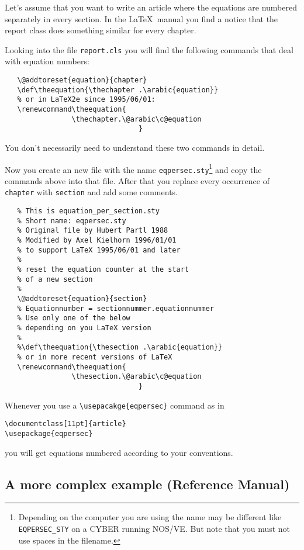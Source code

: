 \documentclass[twoside,a4paper]{refart}
\begin{document}
Let's assume that you want to write an article where the equations are 
numbered separately in every section. In the \LaTeX\ manual you find a 
notice that the report class does something similar for every chapter.

Looking into the file \texttt{report.cls} you will find the following 
commands that deal with equation numbers:\nopagebreak
\begin{verbatim}
   \@addtoreset{equation}{chapter}
   \def\theequation{\thechapter .\arabic{equation}}
   % or in LaTeX2e since 1995/06/01:
   \renewcommand\theequation{
                \thechapter.\@arabic\c@equation
                                }
\end{verbatim}

You don't necessarily need to understand these two commands in detail.

Now you create an new file with the name 
\texttt{eqpersec.sty}\footnote{Depending on the computer you are using 
the name may be different like \texttt{EQPERSEC\_STY} on a CYBER 
running NOS/VE. But note that you must not use spaces in the 
filename.} and copy the commands above into that file.  After that 
you replace every occurrence of \texttt{chapter} with \texttt{section} 
and add some comments.\nopagebreak
\begin{verbatim}
   % This is equation_per_section.sty
   % Short name: eqpersec.sty
   % Original file by Hubert Partl 1988
   % Modified by Axel Kielhorn 1996/01/01
   % to support LaTeX 1995/06/01 and later
   %
   % reset the equation counter at the start
   % of a new section 
   % 
   \@addtoreset{equation}{section}
   % Equationnumber = sectionnummer.equationnummer
   % Use only one of the below 
   % depending on you LaTeX version
   % 
   %\def\theequation{\thesection .\arabic{equation}}
   % or in more recent versions of LaTeX
   \renewcommand\theequation{
                \thesection.\@arabic\c@equation
                                }
\end{verbatim}


Whenever you use a \verb|\usepacakge{eqpersec}| command as in
\nopagebreak
\begin{verbatim}
\documentclass[11pt]{article}
\usepackage{eqpersec}
\end{verbatim}
you will get equations numbered according to your conventions.



\subsection{A more complex example (Reference Manual)}
\label{refmanex}
\end{document}
